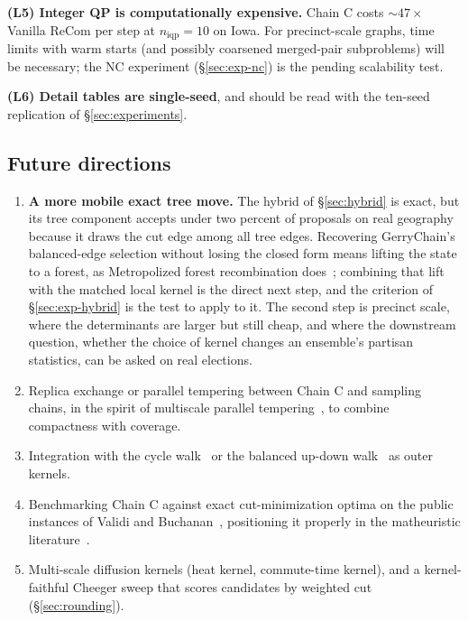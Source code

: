 \documentclass[11pt]{article}
\begin{document}
\textbf{(L5) Integer QP is computationally expensive.} Chain C costs
$\sim 47\times$ Vanilla ReCom per step at $n_{\mathrm{iqp}} = 10$ on
Iowa. For precinct-scale graphs, time limits with warm starts (and
possibly coarsened merged-pair subproblems) will be necessary; the
NC experiment (\S\ref{sec:exp-nc}) is the pending scalability test.

\textbf{(L6) Detail tables are single-seed}, and should be read with
the ten-seed replication of \S\ref{sec:experiments}.

\subsection{Future directions}\label{sec:disc-future}

\begin{enumerate}
  \item \textbf{A more mobile exact tree move.} The hybrid of
    \S\ref{sec:hybrid} is exact, but its tree component accepts under
    two percent of proposals on real geography because it draws the
    cut edge among all tree edges. Recovering GerryChain's
    balanced-edge selection without losing the closed form means
    lifting the state to a forest, as Metropolized forest
    recombination does~\cite{autry2023metropolized}; combining that
    lift with the matched local kernel is the direct next step, and
    the criterion of \S\ref{sec:exp-hybrid} is the test to apply to
    it. The second step is precinct scale, where the determinants are
    larger but still cheap, and where the downstream question,
    whether the choice of kernel changes an ensemble's partisan
    statistics, can be asked on real elections.
  \item Replica exchange or parallel tempering between Chain C and
    sampling chains, in the spirit of multiscale parallel
    tempering~\cite{chuang2025multiscale}, to combine compactness with
    coverage.
  \item Integration with the cycle walk~\cite{deford2025cycle} or the
    balanced up-down walk~\cite{akitaya2026bud} as outer kernels.
  \item Benchmarking Chain C against exact cut-minimization optima on
    the public instances of Validi and
    Buchanan~\cite{validi2022political}, positioning it properly in
    the matheuristic literature~\cite{brous2025recom}.
  \item Multi-scale diffusion kernels (heat kernel, commute-time
    kernel), and a kernel-faithful Cheeger sweep that scores
    candidates by weighted cut (\S\ref{sec:rounding}).
\end{enumerate}
\end{document}
